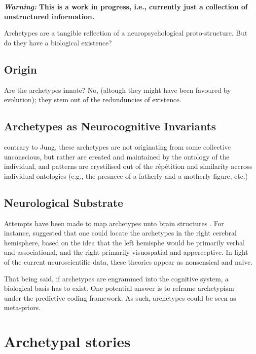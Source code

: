 \documentclass[]{book}
\begin{document}
\textbf{\emph{Warning:} This is a work in progress, i.e., currently just a collection of unstructured information.}

Archetypes are a tangible reflection of a neuropsychological proto-structure. But do they have a biological existence?

\hypertarget{origin}{%
\section{Origin}\label{origin}}

Are the archetypes innate? No, (altough they might have been favoured by evolution); they stem out of the redunduncies of existence.

\hypertarget{archetypes-as-neurocognitive-invariants}{%
\section{Archetypes as Neurocognitive Invariants}\label{archetypes-as-neurocognitive-invariants}}

contrary to Jung, these archetypes are not originating from some collective unconscious, but rather are created and maintained by the ontology of the individual, and patterns are crystilised out of the répétition and similarity accross individual ontologies (e.g., the presnece of a fatherly and a motherly figure, etc.)

\hypertarget{neurological-substrate}{%
\section{Neurological Substrate}\label{neurological-substrate}}

Attempts have been made to map archetypes unto brain structures \citep{samuels2003jung}. For instance, \citet{rossi1977cerebral} suggested that one could locate the archetypes in the right cerebral hemisphere, based on the idea that the left hemisphe would be primarily verbal and associational, and the right primarily visuospatial and apperceptive. In light of the current neuroscientific data, these theories appear as nonsensical and naive.

That being said, if archetypes are engrammed into the cognitive system, a biological basis has to exist. One potential answer is to reframe archetypism under the predictive coding framework. As such, archetypes could be seen as meta-priors.

\hypertarget{archetypal-stories}{%
\chapter{Archetypal stories}\label{archetypal-stories}}
\end{document}
